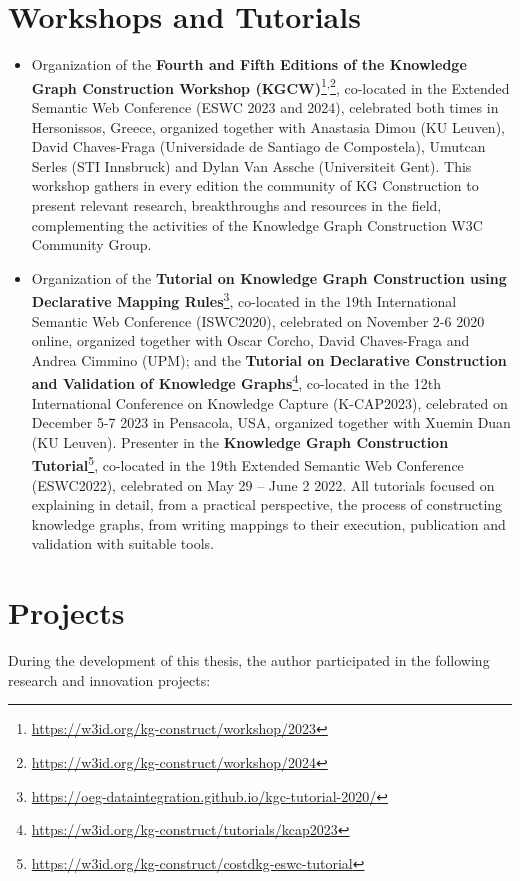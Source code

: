 \section{Workshops and Tutorials}
\begin{itemize}
    \item Organization of the \textbf{Fourth and Fifth Editions of the Knowledge Graph Construction Workshop (KGCW)}\footnote{\url{https://w3id.org/kg-construct/workshop/2023}}\textsuperscript{,}\footnote{\url{https://w3id.org/kg-construct/workshop/2024}}, co-located in the Extended Semantic Web Conference (ESWC 2023 and 2024), celebrated both times in Hersonissos, Greece, organized together with Anastasia Dimou (KU Leuven), David Chaves-Fraga (Universidade de Santiago de Compostela), Umutcan Serles (STI Innsbruck) and Dylan Van Assche (Universiteit Gent). This workshop gathers in every edition the community of KG Construction to present relevant research, breakthroughs and resources in the field, complementing the activities of the Knowledge Graph Construction W3C Community Group. 

    \item Organization of the \textbf{Tutorial on Knowledge Graph Construction using Declarative Mapping Rules}\footnote{\url{https://oeg-dataintegration.github.io/kgc-tutorial-2020/}}, co-located in the 19th International Semantic Web Conference (ISWC2020), celebrated on November 2-6 2020 online, organized together with Oscar Corcho, David Chaves-Fraga and Andrea Cimmino (UPM); 
    and the \textbf{Tutorial on Declarative Construction and Validation of Knowledge Graphs}\footnote{\url{https://w3id.org/kg-construct/tutorials/kcap2023}}, co-located in the 12th International Conference on Knowledge Capture (K-CAP2023), celebrated on December 5-7 2023 in Pensacola, USA, organized together with Xuemin Duan (KU Leuven). 
    Presenter in the \textbf{Knowledge Graph Construction Tutorial}\footnote{\url{https://w3id.org/kg-construct/costdkg-eswc-tutorial}}, co-located in the 19th Extended Semantic Web Conference (ESWC2022), celebrated on May 29 – June 2 2022.
    All tutorials focused on explaining in detail, from a practical perspective, the process of constructing knowledge graphs, from writing mappings to their execution, publication and validation with suitable tools. 
\end{itemize}

\section{Projects}
During the development of this thesis, the author participated in the following research and innovation projects:

